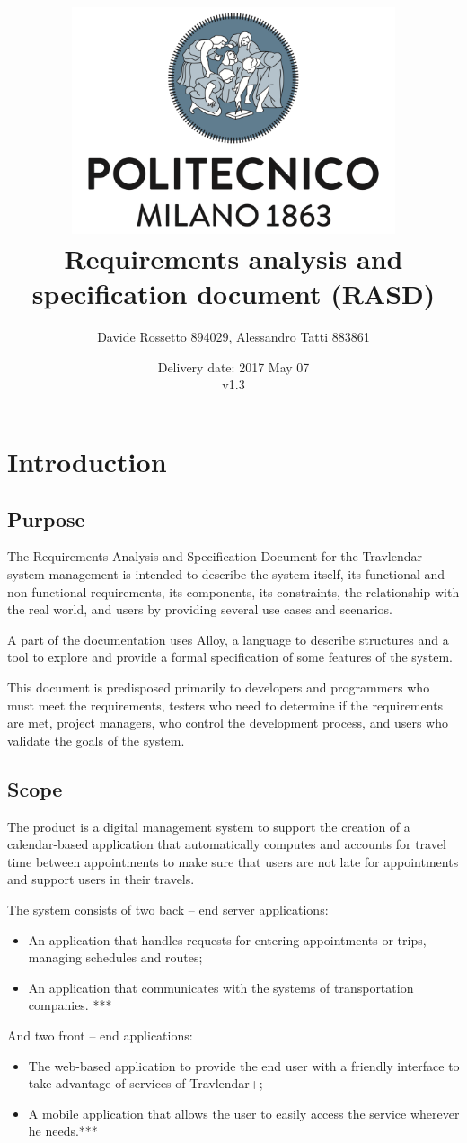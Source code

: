 \documentclass{article}
\title{ 
	\includegraphics[width=95mm]{img/PolimiLogo.png}\\
	\bigskip
	Requirements analysis and specification document (RASD)
}
\author{
	Davide Rossetto 894029, Alessandro Tatti 883861
}
\date{
	Delivery date: 2017 May 07\\
	\bigskip v1.3
}
\begin{document}
	
\maketitle
\newpage
\tableofcontents
\newpage
	
	
	\section{Introduction}
	
	
	\subsection{Purpose}
	The Requirements Analysis and Specification Document for the Travlendar+ system management is intended to describe the system itself, its functional and non-functional requirements, its components, its constraints, the relationship with the real world, and users by providing several use cases and scenarios.
	
	A part of the documentation uses Alloy, a language to describe structures and a tool to explore and provide a formal specification of some features of the system.
	
	\bigskip
	This document is predisposed primarily to developers and programmers who must meet the requirements, testers who need to determine if the requirements are met, project managers, who control the development process, and users who validate the goals of the system.
	
	
	\subsection{Scope}
	The product is a digital management system to support the creation of a calendar-based application that automatically computes and accounts for travel time between appointments to make sure that users are not late for appointments and support users in their travels.

	\bigskip
	The system consists of two back -- end server applications:
	\begin{itemize}
	\item An application that handles requests for entering appointments or trips, managing schedules and routes;
	\item An application that communicates with the systems of transportation companies. ***
	\end{itemize}

	\bigskip
	And two front -- end applications:
	\begin{itemize}
	\item The web-based application to provide the end user with a friendly interface to take advantage of services of Travlendar+;
	\item A mobile application that allows the user to easily access the service wherever he needs.***
	\end{itemize}
\end{document}
